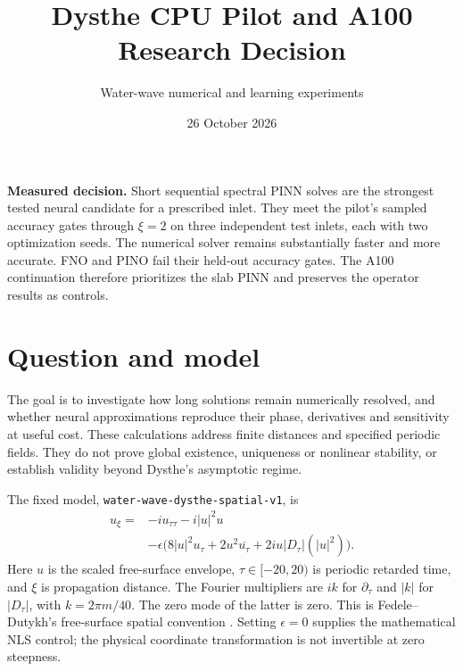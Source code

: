 \documentclass[11pt]{article}
\title{Dysthe CPU Pilot and A100 Research Decision}
\author{Water-wave numerical and learning experiments}
\date{26 October 2026}
\begin{document}
\maketitle
\noindent\textbf{Measured decision.} Short sequential spectral PINN solves are the strongest tested neural candidate for a prescribed inlet. They meet the pilot's sampled accuracy gates through $\xi=2$ on three independent test inlets, each with two optimization seeds. The numerical solver remains substantially faster and more accurate. FNO and PINO fail their held-out accuracy gates. The A100 continuation therefore prioritizes the slab PINN and preserves the operator results as controls.

\section{Question and model}
The goal is to investigate how long solutions remain numerically resolved, and whether neural approximations reproduce their phase, derivatives and sensitivity at useful cost. These calculations address finite distances and specified periodic fields. They do not prove global existence, uniqueness or nonlinear stability, or establish validity beyond Dysthe's asymptotic regime.

The fixed model, \texttt{water-wave-dysthe-spatial-v1}, is
\begin{equation}\label{eq:model}
\begin{split}
u_\xi={}&-i u_{\tau\tau}-i|u|^2u\\
 &-\epsilon\bigl(8|u|^2u_\tau+2u^2\overline{u_\tau}
                  +2iu|D_\tau|(|u|^2)\bigr).
\end{split}
\end{equation}
Here $u$ is the scaled free-surface envelope, $\tau\in[-20,20)$ is periodic retarded time, and $\xi$ is propagation distance. The Fourier multipliers are $ik$ for $\partial_\tau$ and $|k|$ for $|D_\tau|$, with $k=2\pi m/40$. The zero mode of the latter is zero. This is Fedele--Dutykh's free-surface spatial convention \cite{fedele}. Setting $\epsilon=0$ supplies the mathematical NLS control; the physical coordinate transformation is not invertible at zero steepness.
\end{document}
